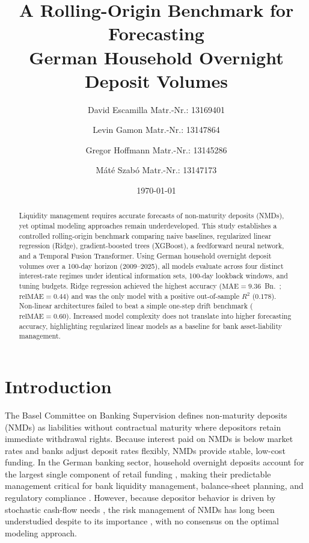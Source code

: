 \documentclass[11pt,a4paper]{article}
\title{\textbf{A Rolling-Origin Benchmark for Forecasting\\
German Household Overnight Deposit Volumes}}
\author[1]{David Escamilla \small Matr.-Nr.: 13169401}
\author[1]{Levin Gamon \small Matr.-Nr.: 13147864}
\author[1]{Gregor Hoffmann \small Matr.-Nr.: 13145286}
\author[1]{Máté Szabó \small Matr.-Nr.: 13147173}
\affil[1]{LMU Munich School of Management, Institute of AI in Management}
\date{\today}
\begin{document}
\maketitle

\begin{abstract}
    \noindent Liquidity management requires accurate forecasts of non-maturity
    deposits (NMDs), yet optimal modeling approaches remain underdeveloped.
    This study establishes a controlled rolling-origin benchmark comparing
    naive baselines, regularized linear regression (Ridge), gradient-boosted
    trees (XGBoost), a feedforward neural network, and a Temporal Fusion
    Transformer. Using German household overnight deposit volumes over a
    100-day horizon (2009--2025), all models evaluate across four distinct
    interest-rate regimes under identical information sets, 100-day lookback
    windows, and tuning budgets. Ridge regression achieved the highest
    accuracy ($\text{MAE} = 9.36$~Bn.~\texteuro; $\text{relMAE} = 0.44$) and
    was the only model with a positive out-of-sample $R^2$ ($0.178$).
    Non-linear architectures failed to beat a simple one-step drift benchmark
    ($\text{relMAE} = 0.60$). Increased model complexity does not translate into
    higher forecasting accuracy, highlighting regularized linear models as a
    baseline for bank asset-liability management.
\end{abstract}

\newpage
\tableofcontents
\newpage

\section{Introduction}
\label{sec:introduction}

The Basel Committee on Banking Supervision \citep{bcbs2016irrbb} defines
non-maturity deposits (NMDs) as liabilities without contractual maturity
where depositors retain immediate withdrawal rights. Because interest paid on
NMDs is below market rates and banks adjust deposit rates flexibly, NMDs
provide stable, low-cost funding. In the German banking sector, household
overnight deposits account for the largest single component of retail funding
\citep{bundesbank2024deposits}, making their predictable management critical for bank liquidity management,
balance-sheet planning, and regulatory compliance \citep{bcbs2016irrbb}. However, because depositor behavior is driven by
stochastic cash-flow needs \citep{marena2022nonmaturing}, the risk management of NMDs has long been understudied despite to its importance \citep{kalkbrener2004}, with no consensus on the optimal modeling approach.
\end{document}
